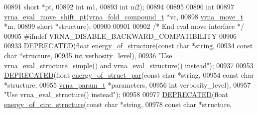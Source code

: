 \begin{DoxyCode}
00891                              \textcolor{keywordtype}{short}      *pt,
00892                              \textcolor{keywordtype}{int}        m1,
00893                              \textcolor{keywordtype}{int}        m2);
00894 
00895 
00896 \textcolor{keywordtype}{int}
00897 \mbox{\hyperlink{group__eval_gad8b0299608b6dd9f6e5554e939cdbbec}{vrna\_eval\_move\_shift\_pt}}(\mbox{\hyperlink{group__fold__compound_structvrna__fc__s}{vrna\_fold\_compound\_t}}  *vc,
00898                         \mbox{\hyperlink{group__neighbors_structvrna__move__s}{vrna\_move\_t}}           *m,
00899                         \textcolor{keywordtype}{short}                 *structure);
00900 
00901 
00902 \textcolor{comment}{/* End eval move interface */}
00905 \textcolor{preprocessor}{#ifndef VRNA\_DISABLE\_BACKWARD\_COMPATIBILITY}
00906 
00933 \mbox{\hyperlink{eval_8h_aab347a3c03fbe8e7319551b9fa0cce4a}{DEPRECATED}}(\textcolor{keywordtype}{float} \mbox{\hyperlink{group__eval_gaf93986cb3cb29770ec9cca69c9fab8cf}{energy\_of\_structure}}(\textcolor{keyword}{const} \textcolor{keywordtype}{char} *\textcolor{keywordtype}{string},
00934                                      \textcolor{keyword}{const} \textcolor{keywordtype}{char} *structure,
00935                                      \textcolor{keywordtype}{int}        verbosity\_level),
00936            \textcolor{stringliteral}{"Use vrna\_eval\_structure\_simple() and vrna\_eval\_structure() instead"});
00937 
00953 \mbox{\hyperlink{eval_8h_aab347a3c03fbe8e7319551b9fa0cce4a}{DEPRECATED}}(\textcolor{keywordtype}{float} \mbox{\hyperlink{group__eval_gaf9d064d3c496de42eca6734a96fd2090}{energy\_of\_struct\_par}}(\textcolor{keyword}{const} \textcolor{keywordtype}{char}    *\textcolor{keywordtype}{string},
00954                                       \textcolor{keyword}{const} \textcolor{keywordtype}{char}    *structure,
00955                                       \mbox{\hyperlink{group__energy__parameters_structvrna__param__s}{vrna\_param\_t}}  *parameters,
00956                                       \textcolor{keywordtype}{int}           verbosity\_level),
00957            \textcolor{stringliteral}{"Use vrna\_eval\_structure() instead"});
00958 
00977 \mbox{\hyperlink{eval_8h_aab347a3c03fbe8e7319551b9fa0cce4a}{DEPRECATED}}(\textcolor{keywordtype}{float} \mbox{\hyperlink{group__eval_gaeb14f3664aec67fc03268ac75253f0f8}{energy\_of\_circ\_structure}}(\textcolor{keyword}{const} \textcolor{keywordtype}{char}  *\textcolor{keywordtype}{string},
00978                                           \textcolor{keyword}{const} \textcolor{keywordtype}{char}  *structure,

\end{DoxyCode}
